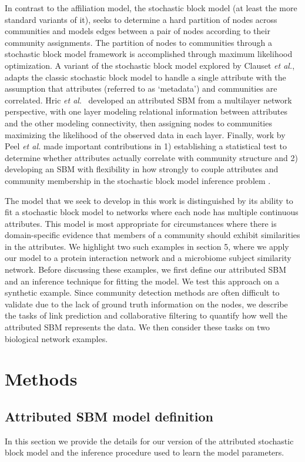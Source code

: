 In contrast to the affiliation model, the stochastic block model \cite{originalSBM} (at least the more standard variants of it), seeks to determine a hard partition of nodes across communities and models edges between a pair of nodes according to their community assignments. The partition of nodes to communities through a stochastic block model framework is accomplished through maximum likelihood optimization. A variant of the stochastic block model explored by Clauset \emph{et al.}, \cite{clauset} adapts the classic stochastic block model to handle a single attribute with the assumption that attributes (referred to as `metadata') and communities are correlated. Hric \emph{et al}.~\cite{hric} developed an attributed SBM from a multilayer network perspective, with one layer modeling relational information between attributes and the other modeling connectivity, then assigning nodes to communities maximizing the likelihood of the observed data in each layer. Finally, work by Peel \emph{et al.} made important contributions in 1) establishing a statistical test to determine whether attributes actually correlate with community structure and 2) developing an SBM with flexibility in how strongly to couple attributes and community membership in the stochastic block model inference problem \cite{peel2017ground}. 

The model that we seek to develop in this work is distinguished by its ability to fit a stochastic block model to networks where each node has multiple continuous attributes. This model is most appropriate for circumstances where there is domain-specific evidence that members of a community should exhibit similarities in the attributes. We highlight two such examples in section 5, where we apply our model to a protein interaction network and a microbiome subject similarity network. Before discussing these examples, we first define our attributed SBM and an inference technique for fitting the model. We test this approach on a synthetic example. Since community detection methods are often difficult to validate due to the lack of ground truth information on the nodes, we describe the tasks of link prediction and collaborative filtering to quantify how well the attributed SBM represents the data. We then consider these tasks on two biological network examples.

\section{Methods}

\subsection{Attributed SBM model definition}
 In this section we provide the details for our version of the attributed stochastic block model and the inference procedure used to learn the model parameters. 

